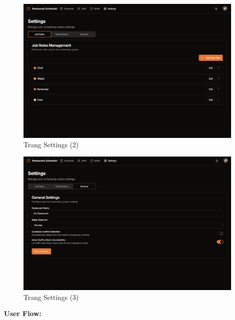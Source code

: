 \begin{figure}[H]
	\centering
	\includegraphics[width=15cm]{Sections/tong_quan/functional_spec/img/proto1.9.png}

     \vspace{0.5cm}
    \caption{Trang Settings (2)}
\end{figure}
\begin{figure}[H]
	\centering
	\includegraphics[width=15cm]{Sections/tong_quan/functional_spec/img/proto1.10.png}

     \vspace{0.5cm}
    \caption{Trang Settings (3)}
\end{figure}

\textbf{User Flow:}

